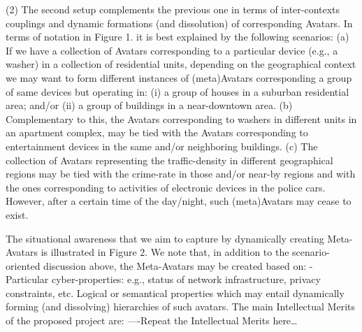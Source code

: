 (2) The second setup complements the previous one in terms of inter-contexts couplings and dynamic formations (and dissolution) of corresponding Avatars. In terms of notation in Figure 1. it is best explained by the following scenarios:
(a) If we have a collection of Avatars corresponding to a particular device (e.g., a washer) in a collection of residential units, depending on the geographical context we may want to form different instances of (meta)Avatars corresponding a group of same devices but operating in: (i) a group of houses in a suburban residential area; and/or (ii) a group of buildings in a near-downtown area.
(b) Complementary to this, the Avatars corresponding to washers in different units in an apartment complex, may be tied with the Avatars corresponding to entertainment devices in the same and/or neighboring buildings.
(c) The collection of Avatars representing the traffic-density in different geographical regions may be tied with the crime-rate in those and/or near-by regions and with the ones corresponding to activities of electronic devices in the police cars. However, after a certain time of the day/night, such (meta)Avatars may cease to exist. 

The situational awareness that we aim to capture by dynamically creating Meta-Avatars is illustrated in Figure 2. We note that, in addition to the scenario-oriented discussion above, the Meta-Avatars may be created based on:
-	Particular cyber-properties: e.g., status of network infrastructure, privacy constraints, etc.
Logical or semantical properties which may entail dynamically forming (and dissolving) hierarchies of such avatars.
The main Intellectual Merits of the proposed project are:
----Repeat the Intellectual Merits here…
